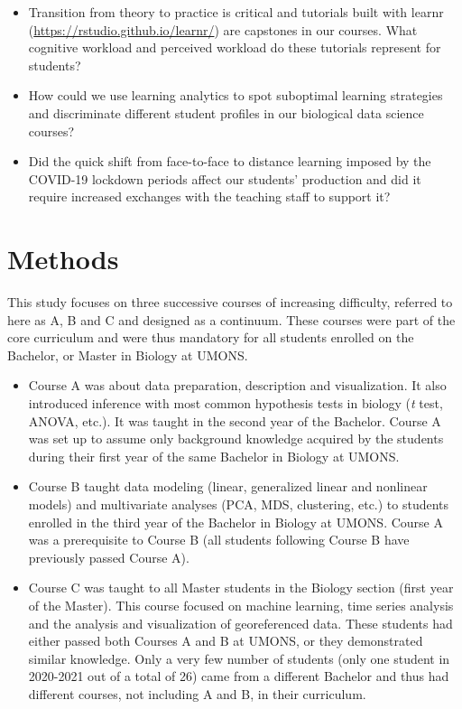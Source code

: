 \documentclass{aims}
\theoremstyle{definition}
\begin{document}
\begin{itemize}
\item
  Transition from theory to practice is critical and tutorials built
  with learnr (\url{https://rstudio.github.io/learnr/}) are capstones in
  our courses. What cognitive workload and perceived workload do these
  tutorials represent for students?
\item
  How could we use learning analytics to spot suboptimal learning
  strategies and discriminate different student profiles in our
  biological data science courses?
\item
  Did the quick shift from face-to-face to distance learning imposed by
  the COVID-19 lockdown periods affect our students' production and did
  it require increased exchanges with the teaching staff to support it?
\end{itemize}

\hypertarget{methods}{%
\section{Methods}\label{methods}}

This study focuses on three successive courses of increasing difficulty,
referred to here as A, B and C and designed as a continuum. These
courses were part of the core curriculum and were thus mandatory for all
students enrolled on the Bachelor, or Master in Biology at UMONS.

\begin{itemize}
\item
  Course A was about data preparation, description and visualization. It
  also introduced inference with most common hypothesis tests in biology
  (\emph{t} test, ANOVA, etc.). It was taught in the second year of the
  Bachelor. Course A was set up to assume only background knowledge
  acquired by the students during their first year of the same Bachelor
  in Biology at UMONS.
\item
  Course B taught data modeling (linear, generalized linear and
  nonlinear models) and multivariate analyses (PCA, MDS, clustering,
  etc.) to students enrolled in the third year of the Bachelor in
  Biology at UMONS. Course A was a prerequisite to Course B (all
  students following Course B have previously passed Course A).
\item
  Course C was taught to all Master students in the Biology section
  (first year of the Master). This course focused on machine learning,
  time series analysis and the analysis and visualization of
  georeferenced data. These students had either passed both Courses A
  and B at UMONS, or they demonstrated similar knowledge. Only a very
  few number of students (only one student in 2020-2021 out of a total
  of 26) came from a different Bachelor and thus had different courses,
  not including A and B, in their curriculum.
\end{itemize}
\end{document}

